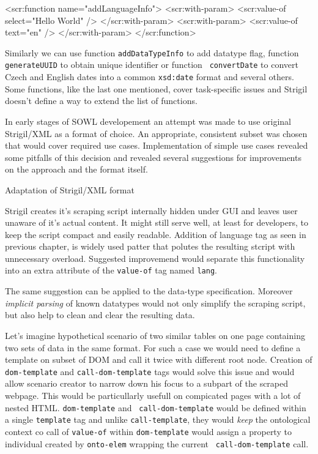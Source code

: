 \begtt
<scr:function name="addLanguageInfo">
  <scr:with-param>
    <scr:value-of select="Hello World" />
  </scr:with-param>
  <scr:with-param>
    <scr:value-of text="en" />
  </scr:with-param>
</scr:function>
\endtt

Similarly we can use function {\tt addDataTypeInfo} to add datatype flag,
function {\tt generateUUID} to obtain unique identifier or function {\tt
convertDate} to convert Czech and English dates into a common {\tt xsd:date}
format and several others. Some functions, like the last one mentioned, cover
task-specific issues and Strigil doesn't define a way to extend the list of
functions. 

In early stages of SOWL developement an attempt was made to use original
Strigil/XML as a format of choice. An appropriate, consistent subset was chosen
that would cover required use cases. Implementation of simple use cases
revealed some pitfalls of this decision and revealed several suggestions for
improvements on the approach and the format itself. 


\secc Adaptation of Strigil/XML format

Strigil creates it's scraping script internally hidden under GUI and leaves
user unaware of it's actual content. It might still serve well, at least for
developers, to keep the script compact and easily readable. Addition of
language tag as seen in previous chapter, is widely used patter that polutes
the resulting stcript with unnecessary overload. Suggested improvemend would
separate this functionality into an extra attribute of the {\tt value-of} tag
named {\tt lang}.

The same suggestion can be applied to the data-type specification. Moreover
{\em implicit parsing} of known datatypes would not only simplify the scraping
script, but also help to clean and clear the resulting data. 

Let's imagine hypothetical scenario of two similar tables on one page
containing two sets of data in the same format. For such a case we would need
to define a template on subset of DOM and call it twice with different root
node. Creation of {\tt dom-template} and {\tt call-dom-template} tags would
solve this issue and would allow scenario creator to narrow down his focus to a
subpart of the scraped webpage. This would be particullarly usefull on
compicated pages with a lot of nested HTML. {\tt dom-template} and {\tt
call-dom-template} would be defined within a single {\tt template} tag and
unlike {\tt call-template}, they would {\em keep} the ontological context co
call of {\tt value-of} within {\tt dom-template} would assign a property to
individual created by {\tt onto-elem} wrapping the current {\tt
call-dom-template} call. 

